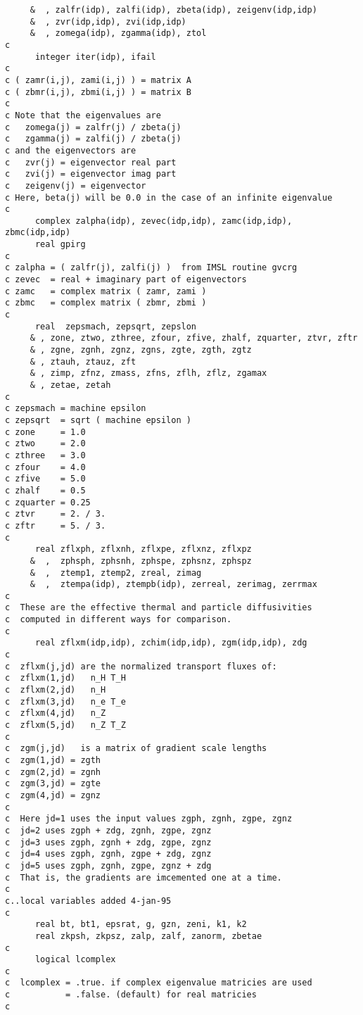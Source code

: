 \begin{verbatim}
     &  , zalfr(idp), zalfi(idp), zbeta(idp), zeigenv(idp,idp)
     &  , zvr(idp,idp), zvi(idp,idp)
     &  , zomega(idp), zgamma(idp), ztol
c
      integer iter(idp), ifail
c
c ( zamr(i,j), zami(i,j) ) = matrix A
c ( zbmr(i,j), zbmi(i,j) ) = matrix B
c
c Note that the eigenvalues are
c   zomega(j) = zalfr(j) / zbeta(j)
c   zgamma(j) = zalfi(j) / zbeta(j)
c and the eigenvectors are
c   zvr(j) = eigenvector real part
c   zvi(j) = eigenvector imag part
c   zeigenv(j) = eigenvector
c Here, beta(j) will be 0.0 in the case of an infinite eigenvalue
c
      complex zalpha(idp), zevec(idp,idp), zamc(idp,idp), zbmc(idp,idp)
      real gpirg
c
c zalpha = ( zalfr(j), zalfi(j) )  from IMSL routine gvcrg
c zevec  = real + imaginary part of eigenvectors
c zamc   = complex matrix ( zamr, zami )
c zbmc   = complex matrix ( zbmr, zbmi )
c
      real  zepsmach, zepsqrt, zepslon
     & , zone, ztwo, zthree, zfour, zfive, zhalf, zquarter, ztvr, zftr
     & , zgne, zgnh, zgnz, zgns, zgte, zgth, zgtz
     & , ztauh, ztauz, zft
     & , zimp, zfnz, zmass, zfns, zflh, zflz, zgamax
     & , zetae, zetah
c
c zepsmach = machine epsilon
c zepsqrt  = sqrt ( machine epsilon )
c zone     = 1.0
c ztwo     = 2.0
c zthree   = 3.0
c zfour    = 4.0
c zfive    = 5.0
c zhalf    = 0.5
c zquarter = 0.25
c ztvr     = 2. / 3.
c zftr     = 5. / 3.
c
      real zflxph, zflxnh, zflxpe, zflxnz, zflxpz
     &  ,  zphsph, zphsnh, zphspe, zphsnz, zphspz
     &  ,  ztemp1, ztemp2, zreal, zimag
     &  ,  ztempa(idp), ztempb(idp), zerreal, zerimag, zerrmax
c
c  These are the effective thermal and particle diffusivities
c  computed in different ways for comparison.
c
      real zflxm(idp,idp), zchim(idp,idp), zgm(idp,idp), zdg
c
c  zflxm(j,jd) are the normalized transport fluxes of:
c  zflxm(1,jd)   n_H T_H
c  zflxm(2,jd)   n_H
c  zflxm(3,jd)   n_e T_e
c  zflxm(4,jd)   n_Z
c  zflxm(5,jd)   n_Z T_Z
c
c  zgm(j,jd)   is a matrix of gradient scale lengths
c  zgm(1,jd) = zgth
c  zgm(2,jd) = zgnh
c  zgm(3,jd) = zgte
c  zgm(4,jd) = zgnz
c
c  Here jd=1 uses the input values zgph, zgnh, zgpe, zgnz
c  jd=2 uses zgph + zdg, zgnh, zgpe, zgnz
c  jd=3 uses zgph, zgnh + zdg, zgpe, zgnz
c  jd=4 uses zgph, zgnh, zgpe + zdg, zgnz
c  jd=5 uses zgph, zgnh, zgpe, zgnz + zdg
c  That is, the gradients are imcemented one at a time.
c
c..local variables added 4-jan-95
c
      real bt, bt1, epsrat, g, gzn, zeni, k1, k2
      real zkpsh, zkpsz, zalp, zalf, zanorm, zbetae
c
      logical lcomplex
c
c  lcomplex = .true. if complex eigenvalue matricies are used
c           = .false. (default) for real matricies
c
\end{verbatim}

